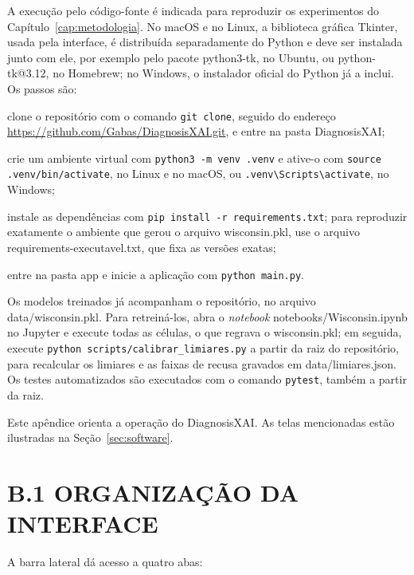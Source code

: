 \documentclass[
    12pt
    ,oneside
    ,a4paper
    ,chapter=TITLE
    ,section=TITLE
    ,sumario=abnt-6027-2012
    ,english,brazil]{abntex2} %
\begin{document}
A execução pelo código-fonte é indicada para reproduzir os experimentos do
Capítulo~\ref{cap:metodologia}. No macOS e no Linux, a biblioteca gráfica
Tkinter, usada pela interface, é distribuída separadamente do Python e deve ser
instalada junto com ele, por exemplo pelo pacote python3-tk, no Ubuntu, ou
python-tk@3.12, no Homebrew; no Windows, o instalador oficial do Python já a
inclui. Os passos são:

\begin{alineas}
    \item clone o repositório com o comando \texttt{git clone}, seguido do
          endereço \url{https://github.com/Gabas/DiagnosisXAI.git}, e entre na
          pasta DiagnosisXAI;
    \item crie um ambiente virtual com \texttt{python3 -m venv .venv} e
          ative-o com \texttt{source .venv/bin/activate}, no Linux e no macOS,
          ou \texttt{.venv\textbackslash Scripts\textbackslash activate}, no
          Windows;
    \item instale as dependências com
          \texttt{pip install -r requirements.txt}; para reproduzir exatamente o
          ambiente que gerou o arquivo wisconsin.pkl, use o arquivo
          requirements-executavel.txt, que fixa as versões exatas;
    \item entre na pasta app e inicie a aplicação com
          \texttt{python main.py}.
\end{alineas}

Os modelos treinados já acompanham o repositório, no arquivo
data/wisconsin.pkl. Para retreiná-los, abra o \textit{notebook}
notebooks/Wisconsin.ipynb no Jupyter e execute todas as células, o que regrava o
wisconsin.pkl; em seguida, execute \texttt{python scripts/calibrar\_limiares.py}
a partir da raiz do repositório, para recalcular os limiares e as faixas de
recusa gravados em data/limiares.json. Os testes automatizados são executados
com o comando \texttt{pytest}, também a partir da raiz.


Este apêndice orienta a operação do DiagnosisXAI. As telas mencionadas estão
ilustradas na Seção~\ref{sec:software}.

\section*{B.1 ORGANIZAÇÃO DA INTERFACE}

A barra lateral dá acesso a quatro abas:
\end{document}
